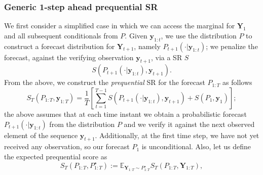 \documentclass[twoside,11pt]{article}
\newcommand{\E}{\mathbb{E}}
\newcommand{\ddobs}{\mathbf{y}}
\newcommand{\Ddobs}{\mathbf{Y}}
\newcommand{\ddobsupt}{\mathbf{y}_{1:t}}
\newcommand{\DdobsupT}{\mathbf{Y}_{1:T}}
\newcommand{\ddobsupT}{\mathbf{y}_{1:T}}
\begin{document}
	
	\subsubsection{Generic 1-step ahead prequential SR}
	We first consider a simplified case in which we can access the marginal for $ \Ddobs_1 $ and all subsequent conditionals from $ P $.
	Given $ \ddobsupt $, we use the distribution $ P $ to construct a forecast distribution for $ \Ddobs_{t+1} $, namely $ P_{t+1}(\cdot|\ddobsupt) $; we penalize the forecast, against the verifying observation $ \ddobs_{t+1} $, via a SR $ S $
	\begin{equation}\label{Eq:app_SR}
	S(P_{t+1}(\cdot|\ddobsupt),\ddobs_{t+1}   ).
	\end{equation}
	From the above, we construct the \textit{prequential} SR for the forecast $ P_{1:T} $ as follows
	\begin{equation}\label{Eq:app_preq_SR}
	S_T(P_{1:T}, \ddobsupT) = \frac{1}{T} \left[\sum_{t=1}^{T-1}	S(P_{t+1}(\cdot|\ddobsupt),\ddobs_{t+1}) + S(P_{1},\ddobs_{1}) \right]; 
	\end{equation}
	the above assumes that at each time instant we obtain a probabilistic forecast $ P_{t+1}(\cdot|\ddobsupt) $ from the distribution $ P $ and we verify it against the next observed element of the sequence $ \ddobs_{t+1} $. Additionally, at the first time step, we have not yet received any observation, so our forecast $ P_1 $ is unconditional.
	Also, let us define the expected prequential score as
	\begin{equation}\label{Eq:app_preq_exp_SR}
	S_T(P_{1:T}, P_{1:T}^\star) := \E_{\DdobsupT\sim P^\star_{1:T}} S_T(P_{1:T}, \DdobsupT),
	\end{equation}
	
\end{document}
